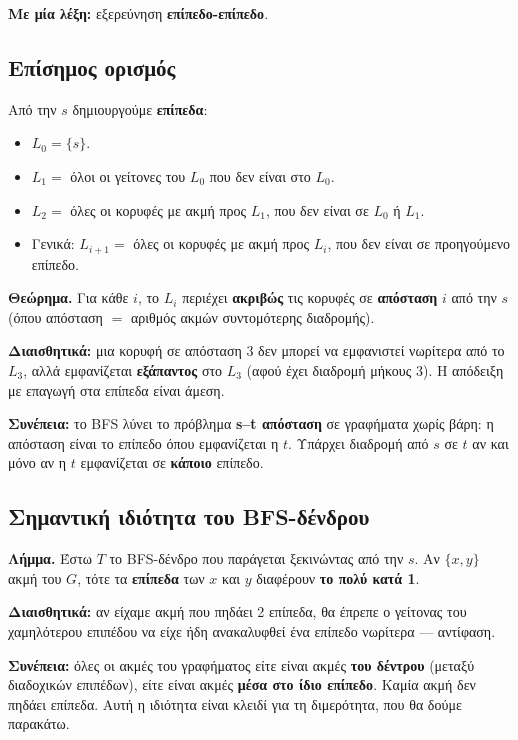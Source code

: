 \documentclass[11pt,a4paper]{article}
\begin{document}
\textbf{Με μία λέξη:} εξερεύνηση \textbf{επίπεδο-επίπεδο}.

\subsection{Επίσημος ορισμός}

Από την $s$ δημιουργούμε \textbf{επίπεδα}:
\begin{itemize}
  \item $L_0 = \{s\}$.
  \item $L_1 = $ όλοι οι γείτονες του $L_0$ που δεν είναι στο $L_0$.
  \item $L_2 = $ όλες οι κορυφές με ακμή προς $L_1$, που δεν είναι σε $L_0$ ή
  $L_1$.
  \item Γενικά: $L_{i+1} = $ όλες οι κορυφές με ακμή προς $L_i$, που δεν είναι
  σε προηγούμενο επίπεδο.
\end{itemize}

\begin{keypoint}
\textbf{Θεώρημα.} Για κάθε $i$, το $L_i$ περιέχει \textbf{ακριβώς} τις κορυφές σε
\textbf{απόσταση} $i$ από την $s$ (όπου απόσταση $=$ αριθμός ακμών συντομότερης
διαδρομής).

\textbf{Διαισθητικά:} μια κορυφή σε απόσταση 3 δεν μπορεί να εμφανιστεί νωρίτερα
από το $L_3$, αλλά εμφανίζεται \textbf{εξάπαντος} στο $L_3$ (αφού έχει διαδρομή
μήκους 3). Η απόδειξη με επαγωγή στα επίπεδα είναι άμεση.

\textbf{Συνέπεια:} το BFS λύνει το πρόβλημα \textbf{s--t απόσταση} σε γραφήματα
χωρίς βάρη: η απόσταση είναι το επίπεδο όπου εμφανίζεται η $t$. Υπάρχει διαδρομή
από $s$ σε $t$ αν και μόνο αν η $t$ εμφανίζεται σε \textbf{κάποιο} επίπεδο.
\end{keypoint}

\subsection{Σημαντική ιδιότητα του BFS-δένδρου}

\begin{keypoint}
\textbf{Λήμμα.} Έστω $T$ το BFS-δένδρο που παράγεται ξεκινώντας από την $s$. Αν
$\{x, y\}$ ακμή του $G$, τότε τα \textbf{επίπεδα} των $x$ και $y$ διαφέρουν
\textbf{το πολύ κατά 1}.

\textbf{Διαισθητικά:} αν είχαμε ακμή που πηδάει 2 επίπεδα, θα έπρεπε ο γείτονας
του χαμηλότερου επιπέδου να είχε ήδη ανακαλυφθεί ένα επίπεδο νωρίτερα ---
αντίφαση.

\textbf{Συνέπεια:} όλες οι ακμές του γραφήματος είτε είναι ακμές \textbf{του
δέντρου} (μεταξύ διαδοχικών επιπέδων), είτε είναι ακμές \textbf{μέσα στο ίδιο
επίπεδο}. Καμία ακμή δεν πηδάει επίπεδα. Αυτή η ιδιότητα είναι κλειδί για τη
διμερότητα, που θα δούμε παρακάτω.
\end{keypoint}
\end{document}

